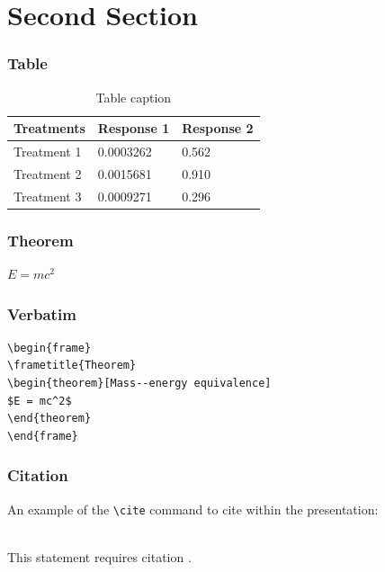 \documentclass{beamer}
\begin{document}
\section{Second Section}

\begin{frame}
\frametitle{Table}
\begin{table}
\begin{tabular}{l l l}
\toprule
\textbf{Treatments} & \textbf{Response 1} & \textbf{Response 2}\\
\midrule
Treatment 1 & 0.0003262 & 0.562 \\
Treatment 2 & 0.0015681 & 0.910 \\
Treatment 3 & 0.0009271 & 0.296 \\
\bottomrule
\end{tabular}
\caption{Table caption}
\end{table}
\end{frame}


\begin{frame}
\frametitle{Theorem}
\begin{theorem}
$E = mc^2$
\end{theorem}
\end{frame}


\begin{frame}[fragile] %
\frametitle{Verbatim}
\begin{example}
\begin{verbatim}
\begin{frame}
\frametitle{Theorem}
\begin{theorem}[Mass--energy equivalence]
$E = mc^2$
\end{theorem}
\end{frame}\end{verbatim}
\end{example}
\end{frame}




\begin{frame}[fragile] %
\frametitle{Citation}
An example of the \verb|\cite| command to cite within the presentation:\\~

This statement requires citation \cite{p1}.
\end{frame}
\end{document}
